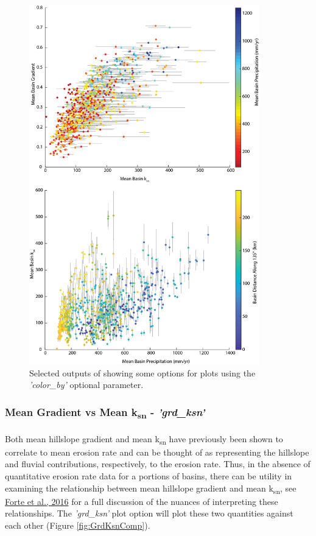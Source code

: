 \begin{figure}[H]
	\centering
	\includegraphics[width=10cm]{PNGs/BasinStats.png}
	\caption{Selected outputs of  showing some options for plots using the \textit{'color\_by'} optional parameter.}
	\label{fig:BsnSts}
\end{figure}

\subsubsection{Mean Gradient vs Mean k\textsubscript{sn} - \textit{'grd\_ksn'}} \label{sec:grdksn}
\paragraph{}Both mean hillslope gradient and mean k\textsubscript{sn} have previously been shown to correlate to mean erosion rate and can be thought of as representing the hillslope and fluvial contributions, respectively, to the erosion rate. Thus, in the absence of quantitative erosion rate data for a portions of basins, there can be utility in examining the relationship between mean hillslope gradient and mean k\textsubscript{sn}, see \href{https://www.sciencedirect.com/science/article/pii/S0012821X16303004}{Forte et al., 2016} for a full discussion of the nuances of interpreting these relationships. The \textit{'grd\_ksn'} plot option will plot these two quantities against each other (Figure \ref{fig:GrdKsnComp}). 

